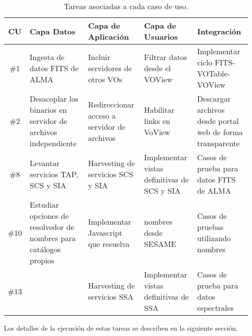 \begin{table}[ht!]
    \begin{center}
	\begin{tabular}{c|p{1.2in}|p{1.4in}|p{1.3in}|p{1.3in}}
	    \textbf{CU} & \textbf{Capa Datos} &
	    \textbf{Capa de Aplicación} & \textbf{Capa de Usuarios} &
	    \textbf{Integración} \\\hline\hline
	    \#1 & 
	    Ingesta de datos FITS de ALMA & Incluir servidores de otros
	    VOs & Filtrar datos desde el VOView & Implementar ciclo
	    FITS-VOTable-VOView \\\hline
	    \#2 & Desacoplar los binarios en servidor de archivos
	    independiente & Redireccionar acceso a servidor de
	    archivos & Habilitar links en VoView & Descargar archivos
	    desde portal web de forma transparente \\\hline
	    \#8 & Levantar servicios TAP, SCS y SIA & Harvesting de
	    servicios SCS y SIA & Implementar vistas definitivas de
	    SCS y SIA & Casos de prueba para datos FITS de ALMA \\\hline
	    \#10 &
	    Estudiar opciones de resolvedor de nombres para catálogos
	    propios & Implementar Javascript que resuelva & nombres
	    desde SESAME & Casos de pruebas utilizando nombres \\\hline
	    \#13 & & 
	    Harvesting de servicios SSA & Implementar vistas
	    definitivas de SSA & Casos de prueba para datos
	    espectrales \\
	\end{tabular}
    \end{center}
    \caption{Tareas asociadas a cada caso de uso.}
\end{table}

Los detalles de la ejecución de estas tareas se describen en la siguiente
sección.



